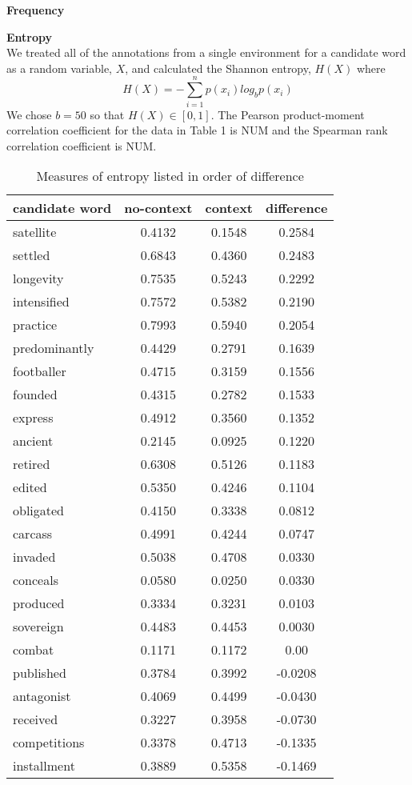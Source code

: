 \documentclass[11pt]{article}
\begin{document}
\begin{description}

\item{\textbf{Frequency}} \\

\item{\textbf{Entropy}} \\
We treated all of the annotations from a single environment for a candidate word as a random variable, $X$, and calculated the Shannon entropy, $H(X)$ where \[  H(X) = - \displaystyle \sum_{i=1}^n p(x_i)log_bp(x_i) \] We chose $b=50$ so that $H(X) \in [0,1]$. The Pearson product-moment correlation coefficient for the data in Table 1 is NUM and the Spearman rank correlation coefficient is NUM.

\begin{table}
\centering
\begin{tabular}{l | c | c | c}
candidate word & no-context & context & difference\\
\hline
satellite & 0.4132 & 0.1548 & 0.2584\\
settled & 0.6843 & 0.4360 & 0.2483\\
longevity & 0.7535 & 0.5243 & 0.2292\\
intensified & 0.7572 & 0.5382 & 0.2190\\
practice & 0.7993 & 0.5940 & 0.2054\\
predominantly & 0.4429 & 0.2791 & 0.1639\\
footballer & 0.4715 & 0.3159 & 0.1556\\
founded & 0.4315 & 0.2782 & 0.1533\\
express & 0.4912 & 0.3560 & 0.1352\\
ancient & 0.2145 & 0.0925 & 0.1220\\
retired & 0.6308 & 0.5126 & 0.1183\\
edited & 0.5350 & 0.4246 & 0.1104\\
obligated & 0.4150 & 0.3338 & 0.0812\\
carcass & 0.4991 & 0.4244 & 0.0747\\
invaded & 0.5038 & 0.4708 & 0.0330\\
conceals & 0.0580 & 0.0250 & 0.0330\\
produced & 0.3334 & 0.3231 & 0.0103\\
sovereign & 0.4483 & 0.4453 & 0.0030\\
combat & 0.1171 & 0.1172 & 0.00\\
published & 0.3784 & 0.3992 & -0.0208\\
antagonist & 0.4069 & 0.4499 & -0.0430\\
received & 0.3227 & 0.3958 & -0.0730\\
competitions & 0.3378 & 0.4713 & -0.1335\\
installment & 0.3889 & 0.5358 & -0.1469\\
\end{tabular}
\caption{Measures of entropy listed in order of difference}
\label{tab:myfirsttable}
\end{table}


\end{description}
\end{document}

